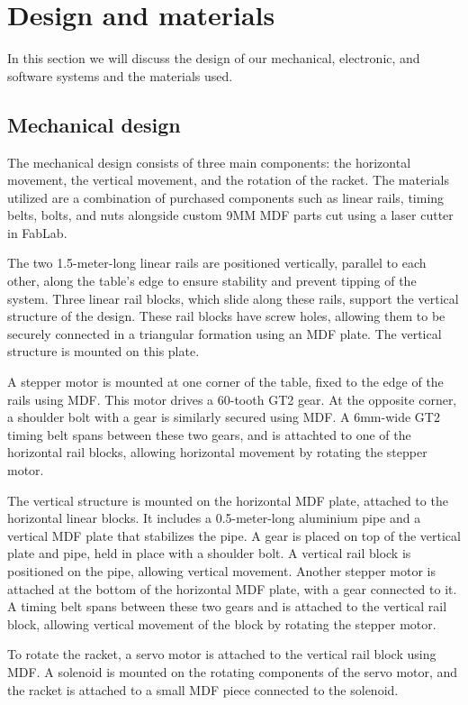 \chapter{Design and materials}
In this section we will discuss the design of our mechanical, electronic, and software systems and the materials used.

\section{Mechanical design}
The mechanical design consists of three main components: the horizontal movement,  the vertical movement,  and the rotation of the racket. 
The materials utilized are a combination of purchased components such as linear rails, timing belts, bolts, and nuts  
alongside custom 9MM MDF parts cut using a laser cutter in FabLab.

The two 1.5-meter-long linear rails are positioned vertically, parallel to each other, along the table's edge to ensure stability and prevent tipping of the system. 
Three linear rail blocks, which slide along these rails, support the vertical structure of the design. 
These rail blocks have screw holes, allowing them to be securely connected in a triangular formation using an MDF plate.
The vertical structure is mounted on this plate.

A stepper motor is mounted at one corner of the table, fixed to the edge of the rails using MDF. 
This motor drives a 60-tooth GT2 gear. 
At the opposite corner, a shoulder bolt with a gear is similarly secured using MDF. 
A 6mm-wide GT2 timing belt spans between these two gears, and is attachted to one of the horizontal rail blocks, allowing horizontal movement by rotating the stepper motor.

The vertical structure is mounted on the horizontal MDF plate, attached to the horizontal linear blocks. 
It includes a 0.5-meter-long aluminium pipe and a vertical MDF plate that stabilizes the pipe.
A gear is placed on top of the vertical plate and pipe, held in place with a shoulder bolt.
A vertical rail block is positioned on the pipe, allowing vertical movement.
Another stepper motor is attached at the bottom of the horizontal MDF plate, with a gear connected to it.
A timing belt spans between these two gears and is attached to the vertical rail block, allowing vertical movement of the block by rotating the stepper motor.

To rotate the racket, a servo motor is attached to the vertical rail block using MDF. 
A solenoid is mounted on the rotating components of the servo motor, and the racket is attached to a small MDF piece connected to the solenoid.
 
